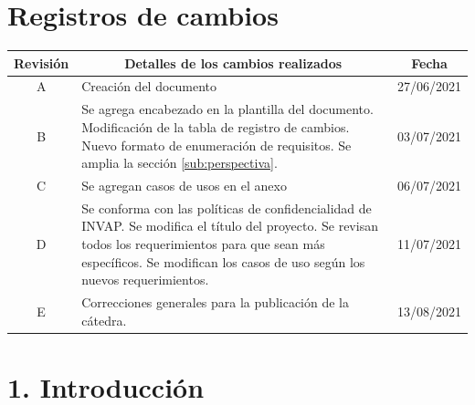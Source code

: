 \documentclass[
11pt, %
codirector, %
]{charter}
\begin{document}
\maketitle
\thispagestyle{empty}
\pagebreak


\thispagestyle{empty}
{\setlength{\parskip}{0pt}
\tableofcontents{}
}
\pagebreak


\section*{Registros de cambios}
\label{sec:registro}

\begin{table}[ht]
\label{tab:registro}
\centering
\begin{tabularx}{\linewidth}{@{}|c|X|c|@{}}
\hline
\rowcolor[HTML]{C0C0C0} 
Revisión & \multicolumn{1}{c|}{\cellcolor[HTML]{C0C0C0}Detalles de los cambios realizados} & Fecha      \\ \hline
A & Creación del documento & 27/06/2021 \\ \hline
B & Se agrega encabezado en la plantilla del documento. \newline
	Modificación de la tabla de registro de cambios. \newline
	Nuevo formato de enumeración de requisitos.\newline
	Se amplia la sección \ref{sub:perspectiva}. & 03/07/2021 \\ \hline
C & Se agregan casos de usos en el anexo & 06/07/2021 \\ \hline
D & Se conforma con las políticas de confidencialidad de INVAP. \newline
    Se modifica el título del proyecto. \newline
    Se revisan todos los requerimientos para que sean más específicos. \newline
    Se modifican los casos de uso según los nuevos requerimientos. & 11/07/2021 \\ \hline
E & Correcciones generales para la publicación de la cátedra. & 13/08/2021 \\ \hline
\end{tabularx}
\end{table}

\pagebreak

\section{1. Introducción}
\label{sec:introduccion}
\end{document}
